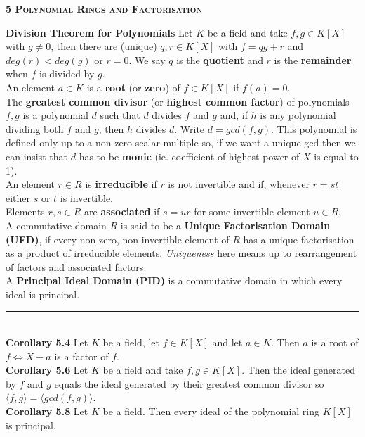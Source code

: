 \documentclass[a4paper]{article}
\begin{document}
\newpage
\begin{framed}
	\begin{center}
		\textbf{\textsc{5 Polynomial Rings and Factorisation}}
	\end{center}
	\textbf{Division Theorem for Polynomials} Let $K$ be a field and take $f, g \in K[X]$ with $g \neq 0$, then there are (unique) $q, r \in K[X]$ with $f = qg + r$ and $deg(r) < deg(g)$ or $r = 0$. We say $q$ is the \textbf{quotient} and $r$ is the \textbf{remainder} when $f$ is divided by $g$.\\
	
	\noindent
	An element $a \in K$ is a \textbf{root} (or \textbf{zero}) of $f \in K[X]$ if $f(a) = 0$.\\
	
	\noindent
	The \textbf{greatest common divisor} (or \textbf{highest common factor}) of polynomials $f, g$ is a polynomial $d$ such that $d$ divides $f$ and $g$ and, if $h$ is any polynomial dividing both $f$ and $g$, then $h$ divides $d$. Write $d = gcd(f, g)$. This polynomial is defined only up to a non-zero scalar multiple so, if we want a unique gcd then we can insist that $d$ has to be \textbf{monic} (ie. coefficient of highest power of $X$ is equal to 1).\\
	
	\noindent
	An element $r \in R$ is \textbf{irreducible} if $r$ is not invertible and if, whenever $r = st$ either $s$ or $t$ is invertible.\\
	
	\noindent
	Elements $r, s \in R$ are \textbf{associated} if $s = ur$ for some invertible element $u \in R$.\\
	
	\noindent
	A commutative domain $R$ is said to be a \textbf{Unique Factorisation Domain (UFD)}, if every non-zero, non-invertible element of $R$ has a unique factorisation as a product of irreducible elements. \textit{Uniqueness} here means up to rearrangement of factors and associated factors.\\
	
	\noindent
	A \textbf{Principal Ideal Domain (PID)} is a commutative domain in which every ideal is principal.
		
	\noindent\rule{\textwidth}{0.5pt}\\
	
	\noindent
	\textbf{Corollary 5.4} Let $K$ be a field, let $f \in K[X]$ and let $a \in K$. Then $a$ is a root of $f \iff X - a$ is a factor of $f$.\\
	
	\noindent
	\textbf{Corollary 5.6} Let $K$ be a field and take $f, g \in K[X]$. Then the ideal generated by $f$ and $g$ equals the ideal generated by their greatest common divisor so $\langle f, g \rangle = \langle gcd(f, g) \rangle$.\\
	
	\noindent
	\textbf{Corollary 5.8} Let $K$ be a field. Then every ideal of the polynomial ring $K[X]$ is principal.
\end{framed}
\end{document}
